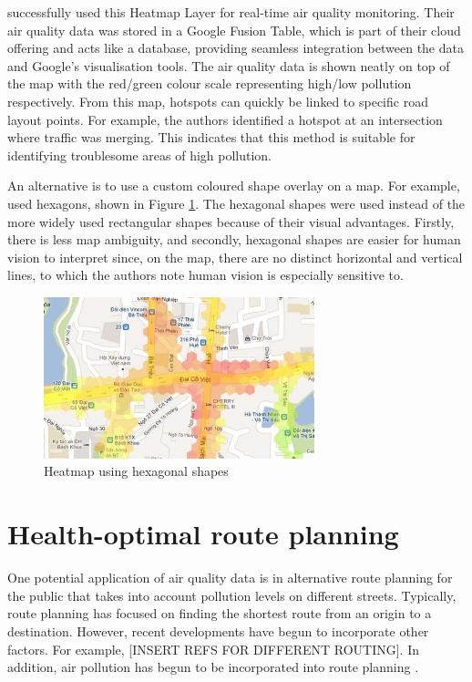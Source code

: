 \documentclass[11pt]{report}
\begin{document}
\cite{Devarakonda2013} successfully used this Heatmap Layer for real-time air quality monitoring. Their air quality data was stored in a Google Fusion Table, which is part of their cloud offering and acts like a database, providing seamless integration between the data and Google's visualisation tools. The air quality data is shown neatly on top of the map with the red/green colour scale representing high/low pollution respectively. From this map, hotspots can quickly be linked to specific road layout points. For example, the authors identified a hotspot at an intersection where traffic was merging. This indicates that this method is suitable for identifying troublesome areas of high pollution.

An alternative is to use a custom coloured shape overlay on a map. For example, \cite{Hoang2013hanoihexagons} used hexagons, shown in Figure \ref{hanoihexagons}. The hexagonal shapes were used instead of the more widely used rectangular shapes because of their visual advantages. Firstly, there is less map ambiguity, and secondly, hexagonal shapes are easier for human vision to interpret since, on the map, there are no distinct horizontal and vertical lines, to which the authors note human vision is especially sensitive to. 

\begin{figure}[!htb]
\centering
\includegraphics[width=0.7\textwidth]{hanoihexagons}
\caption{Heatmap using hexagonal shapes \citep{Hoang2013hanoihexagons}}
\label{hanoihexagons}
\end{figure}

\section{Health-optimal route planning}

One potential application of air quality data is in alternative route planning for the public that takes into account pollution levels on different streets. Typically, route planning has focused on finding the shortest route from an origin to a destination. However, recent developments have begun to incorporate other factors. For example, [INSERT REFS FOR DIFFERENT ROUTING]. In addition, air pollution has begun to be incorporated into route planning \citep{sharker2014exposureroutes, Hasenfratz2015highresmapsTram}.
\end{document}
